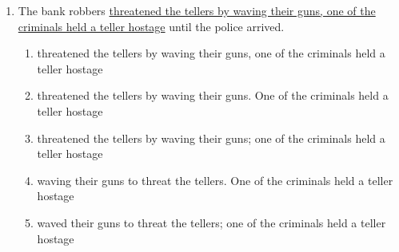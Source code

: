 \begin{enumerate}
\begin{spacing}{1.5}
\begin{enumerate}[label=(\Alph*)]
\hrulefill

\item Americans take the right to vote for granted according to many people, and I think that it is the right of Americans to not exercise their right to vote.

\hrulefill

\item Many people think that Americans had taken the right to vote for granted, and I think that it is has been the right of Americans to not exercise their right to vote.

\hrulefill

\item Many people think that Americans take the right to vote for granted, but I think that it is the right of Americans to not exercise their right to vote.

\hrulefill

\item Americans take the right to vote for granted, yet it is the right of Americans to not exercise their right to vote.

\hrulefill
\end{enumerate}
\end{spacing}

\bigskip
\item The bank robbers \ul{threatened the tellers by waving their guns, one of the criminals held a teller hostage} until the police arrived. 

\begin{spacing}{1.5}
\begin{enumerate}[label=(\Alph*)]
\item threatened the tellers by waving their guns, one of the criminals held a teller hostage

\hrulefill

\item threatened the tellers by waving their guns. One of the criminals held a teller hostage

\hrulefill

\item threatened the tellers by waving their guns; one of the criminals held a teller hostage

\hrulefill

\item waving their guns to threat the tellers. One of the criminals held a teller hostage

\hrulefill

\item waved their guns to threat the tellers; one of the criminals held a teller hostage


\end{enumerate}
\end{spacing}
\end{enumerate}
